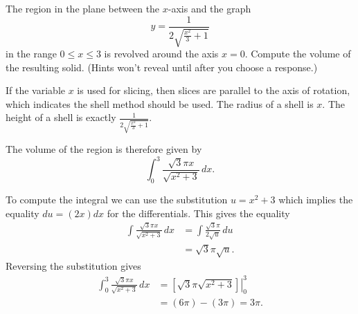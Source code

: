 \documentclass{ximera}
\begin{document}
\begin{question}%

The region in the plane between the  \(x\)-axis and the graph
\[ y = \frac{1}{2 \sqrt{\frac{x^{2}}{3} + 1}} \]
 in the range \(0 \leq x \leq 3\) is revolved around the axis \(x = 0\). Compute the volume of the resulting solid.
 (Hints won't reveal until after you choose a response.)
\begin{multiplechoice}
\choice{\(\displaystyle 2 \pi\)}
\choice[correct]{\(\displaystyle 3 \pi\)}
\choice{\(\displaystyle 5 \pi\)}
\end{multiplechoice}
\begin{feedback}
If the variable \(x\) is used for slicing, then slices are parallel to the axis of rotation, which indicates the shell method should be used.
The radius of a shell is \(x\). The height of a shell is exactly \(\frac{1}{2 \sqrt{\frac{x^{2}}{3} + 1}}\).
\begin{hint}
The volume of the region is therefore given by
\[ \int_{0}^{3} \frac{\sqrt{3} \pi x}{\sqrt{x^{2} + 3}}\, dx. \]
\begin{hint}
 To compute the integral we can use the substitution \(u = x^{2} + 3\) which implies the equality \(du = \left(2 x\right)dx\) for the differentials. This gives the equality
\[ \begin{aligned} \int \frac{\sqrt{3} \pi x}{\sqrt{x^{2} + 3}}\, dx & = \int \frac{\sqrt{3} \pi}{2 \sqrt{u}}\, du \\
 & = \sqrt{3} \pi \sqrt{u}. \end{aligned} \]
Reversing the substitution gives
\[ \begin{aligned} \int_{0}^{3} \frac{\sqrt{3} \pi x}{\sqrt{x^{2} + 3}}\, dx & = \left. \left[\sqrt{3} \pi \sqrt{x^{2} + 3} \right] \right|_{0}^{3}\\ & = \left(6 \pi \right) - \left(3 \pi \right) = 3 \pi. \end{aligned} \]
\end{hint}
\end{hint}
\end{feedback}

\end{question}
\end{document}
